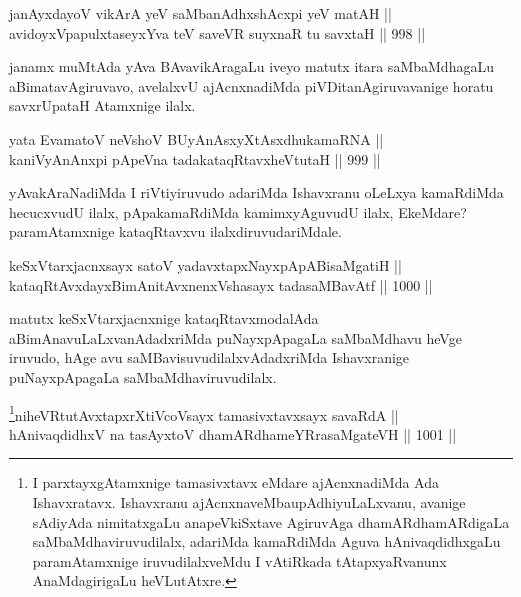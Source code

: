 
\begin{shl}
janAyxdayoV vikArA yeV saMbanAdhxshAcxpi yeV matAH || \\
avidoyxVpapulxtaseyxYva teV saveVR suyxnaR tu savxtaH \hfill || 998 ||  
\end{shl}

\begin{artha}
janamx muMtAda yAva BAvavikAragaLu iveyo matutx itara saMbaMdhagaLu aBimatavAgiruvavo, avelalxvU ajAcnxnadiMda piVDitanAgiruvavanige horatu savxrUpataH Atamxnige ilalx.
\end{artha}

\begin{shl}
yata EvamatoV neVshoV BUyAnAsxyXtAsxdhukamaRNA || \\
kaniVyAnAnxpi pApeVna tadakataqRtavxheVtutaH \hfill || 999 ||  
\end{shl}

\begin{artha}
yAvakAraNadiMda I riVtiyiruvudo adariMda Ishavxranu oLeLxya kamaRdiMda hecucxvudU ilalx, pApakamaRdiMda kamimxyAguvudU ilalx, EkeMdare? paramAtamxnige kataqRtavxvu ilalxdiruvudariMdale.
\end{artha}

\begin{shl}
keSxVtarxjacnxsayx satoV yadavxtapxNayxpApABisaMgatiH || \\
kataqRtAvxdayxBimAnitAvxnenxVshasayx tadasaMBavAtf \hfill || 1000 ||  
\end{shl}

\begin{artha}
matutx keSxVtarxjacnxnige kataqRtavxmodalAda aBimAnavuLaLxvanAdadxriMda puNayxpApagaLa saMbaMdhavu heVge iruvudo, hAge avu saMBavisuvudilalxvAdadxriMda Ishavxranige puNayxpApagaLa saMbaMdhaviruvudilalx.
\end{artha}

\begin{shl}
\footnote{I parxtayxgAtamxnige tamasivxtavx eMdare ajAcnxnadiMda Ada Ishavxratavx. Ishavxranu ajAcnxnaveMba\break upAdhiyuLaLxvanu, avanige sAdiyAda nimitatxgaLu anapeVkiSxtave AgiruvAga dhamARdhamARdigaLa saMbaMdhaviruvudilalx, adariMda kamaRdiMda Aguva hAnivaqdidhxgaLu paramAtamxnige iruvudilalxveMdu I vAtiRkada tAtapxyaRvanunx AnaMdagirigaLu heVLutAtxre.}niheVRtutAvxtapxrXtiVcoV\s sayx tamasivxtavxsayx savaRdA || \\
hAnivaqdidhxV na tasAyxtoV dhamARdhameYRrasaMgateVH \hfill || 1001 ||  
\end{shl}

